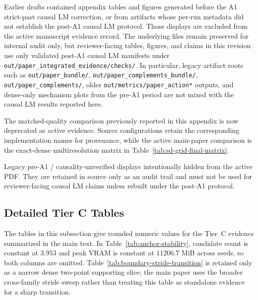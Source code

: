 \documentclass{article}
\theoremstyle{plain}
\theoremstyle{definition}
\theoremstyle{remark}
\begin{document}
Earlier drafts contained appendix tables and figures generated before the A1
strict-past causal LM correction, or from artifacts whose per-run metadata did
not establish the post-A1 causal LM protocol.  Those displays are excluded from
the active manuscript evidence record.  The underlying files remain preserved
for internal audit only, but reviewer-facing tables, figures, and claims in this
revision use only validated post-A1 causal LM manifests under
\texttt{out/paper\_integrated\_evidence/checks/}.  In particular, legacy
artifact roots such as \texttt{out/paper\_bundle/},
\texttt{out/paper\_complements\_bundle/}, \texttt{out/paper\_complements/},
older \texttt{out/metrics/paper\_action*} outputs, and dense-only mechanism
plots from the pre-A1 period are not mixed with the causal LM results reported
here.

The matched-quality comparison previously reported in this appendix is now
deprecated as active evidence.  Source configurations retain the corresponding
implementation names for provenance, while the active main-paper comparison is
the exact-dense multiresolution matrix in Table~\ref{tab:sd-grid-final-matrix}.

\iffalse
Legacy pre-A1 / causality-unverified displays intentionally hidden from the
active PDF. They are retained in source only as an audit trail and must not be
used for reviewer-facing causal LM claims unless rebuilt under the post-A1
protocol.

\subsection{Detailed Tier C Tables}
\label{app:tier-c-tables}

The tables in this subsection give rounded numeric values for the Tier~C evidence summarized in the main text. In Table~\ref{tab:anchor-stability}, candidate count is constant at $3.953$ and peak VRAM is constant at $11206.7$ MiB across seeds, so both columns are omitted. Table~\ref{tab:boundary-stride-transition} is retained only as a narrow dense two-point supporting slice; the main paper uses the broader cross-family stride sweep rather than treating this table as standalone evidence for a sharp transition.
\end{document}
